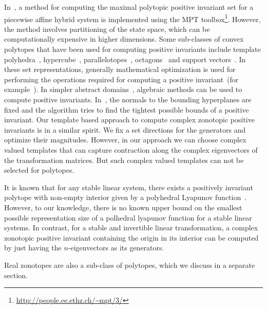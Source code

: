 In~\cite{rakovic2004computation}, a method for computing the maximal
polytopic positive invariant set for a piecewise affine hybrid system
is implemented using the MPT
toolbox\footnote{\url{http://people.ee.ethz.ch/~mpt/3/}}.  However,
the method involves partitioning of the state space, which can be
computationally expensive in higher dimensions.  Some sub-classes of
convex polytopes that have been used for computing positive invariants
include template
polyhedra~\cite{Gawlitza,Sankaranarayanan+Dang+Ivancic-08-Symbolic},
hypercube~\cite{cousot1976static,tiwari2008generating},
parallelotopes~\cite{amato2012abstract},
octagons~\cite{DBLP:journals/lisp/Mine06} and support
vectors~\cite{FLD+11}. In these set representations, generally
mathematical optimization is used for performing the operations
required for computing a positive invariant~(for
example~\cite{Gawlitza,dang1998reachability}).  In simpler abstract
domains~\cite{DBLP:journals/lisp/Mine06,cousot1976static,amato2012abstract},
algebraic methods can be used to compute positive invariants.
In~\cite{Gawlitza}, the normals to the bounding hyperplanes are fixed
and the algorithm tries to find the tightest possible bounds
of a positive invariant.  Our template based approach to
compute complex zonotopic positive invariants is in a similar spirit.
We fix a set directions for the generators and optimize their
magnitudes.  However, in our approach we can choose complex valued
templates that can capture contraction along the complex eigenvectors
of the transformation matrices.  But such complex valued templates can
not be selected for polytopes.

It is known that for any stable linear system, there exists a
positively invariant polytope with non-empty interior given by a
polyhedral Lyapunov function~\cite{blanchini2008set}.  However, to our
knowledge, there is no known upper bound on the smallest possible
representation size of a polhedral lyapunov function for a stable
linear systems.  In contrast, for a stable and invertible linear
transformation, a complex zonotopic positive invariant containing the
origin in its interior can be computed by just having the
$n$-eigenvectors as its generators.

Real zonotopes are also a sub-class of polytopes, which we discuss in
a separate section.

          
